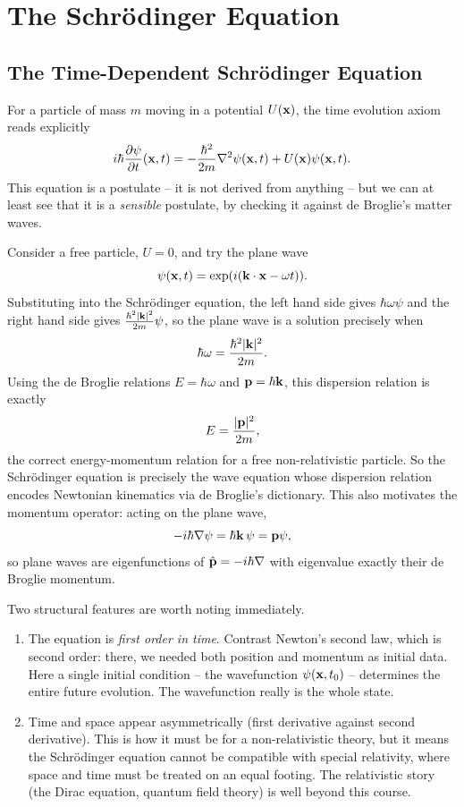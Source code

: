 \documentclass[a4paper]{scrartcl}
\begin{document}
\section{The Schr\"odinger Equation}

\subsection{The Time-Dependent Schr\"odinger Equation}

For a particle of mass $m$ moving in a potential $U(\mathbf{x})$, the time evolution axiom reads explicitly
$$
i \hbar \frac{\partial \psi}{\partial t}(\mathbf{x}, t) = -\frac{\hbar^2}{2m} \nabla^2 \psi(\mathbf{x}, t) + U(\mathbf{x}) \psi(\mathbf{x}, t).
$$
This equation is a postulate -- it is not derived from anything -- but we can at least see that it is a \emph{sensible} postulate, by checking it against de Broglie's matter waves.

Consider a free particle, $U = 0$, and try the plane wave
$$
\psi(\mathbf{x}, t) = \exp(i(\mathbf{k} \cdot \mathbf{x} - \omega t)).
$$
Substituting into the Schr\"odinger equation, the left hand side gives $\hbar \omega \psi$ and the right hand side gives $\frac{\hbar^2 \lvert\mathbf{k}\rvert^2}{2m} \psi$, so the plane wave is a solution precisely when
$$
\hbar \omega = \frac{\hbar^2 \lvert\mathbf{k}\rvert^2}{2m}.
$$
Using the de Broglie relations $E = \hbar \omega$ and $\mathbf{p} = \hbar \mathbf{k}$, this dispersion relation is exactly
$$
E = \frac{\lvert\mathbf{p}\rvert^2}{2m},
$$
the correct energy-momentum relation for a free non-relativistic particle. So the Schr\"odinger equation is precisely the wave equation whose dispersion relation encodes Newtonian kinematics via de Broglie's dictionary. This also motivates the momentum operator: acting on the plane wave,
$$
-i\hbar \nabla \psi = \hbar \mathbf{k} \, \psi = \mathbf{p} \psi,
$$
so plane waves are eigenfunctions of $\hat{\mathbf{p}} = -i\hbar\nabla$ with eigenvalue exactly their de Broglie momentum.

\begin{remark}
    Two structural features are worth noting immediately.
    \begin{enumerate}[label=(\roman*)]
        \item The equation is \emph{first order in time}. Contrast Newton's second law, which is second order: there, we needed both position and momentum as initial data. Here a single initial condition -- the wavefunction $\psi(\mathbf{x}, t_0)$ -- determines the entire future evolution. The wavefunction really is the whole state.
        \item Time and space appear asymmetrically (first derivative against second derivative). This is how it must be for a non-relativistic theory, but it means the Schr\"odinger equation cannot be compatible with special relativity, where space and time must be treated on an equal footing. The relativistic story (the Dirac equation, quantum field theory) is well beyond this course.
    \end{enumerate}
\end{remark}
\end{document}
